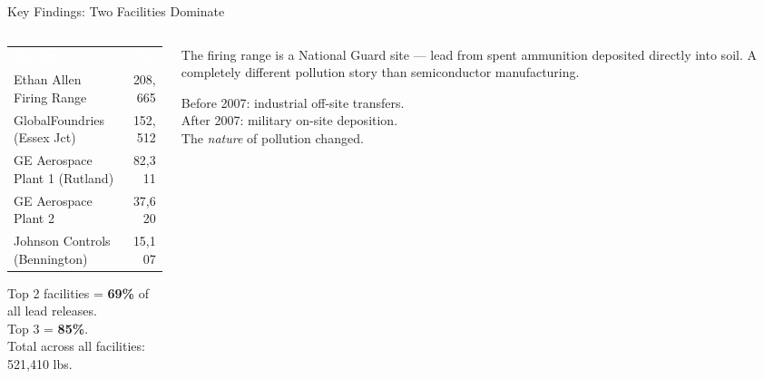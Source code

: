 \documentclass[aspectratio=169, 10pt]{beamer}
\begin{document}
\begin{frame}{Key Findings: Two Facilities Dominate}
\begin{columns}[T]
\begin{column}{0.55\textwidth}
\vskip2pt
{\small
\begin{tabular}{>{\raggedright\arraybackslash}m{4.8cm} r}
\rowcolor{SlateTeal}
\textcolor{white}{\textbf{Facility}} & \textcolor{white}{\textbf{Lbs}} \\[2pt]
\rowcolor{PaleSage}
Ethan Allen Firing Range & 208,665 \\[2pt]
\rowcolor{white}
GlobalFoundries (Essex Jct) & 152,512 \\[2pt]
\rowcolor{PaleSage}
GE Aerospace Plant 1 (Rutland) & 82,311 \\[2pt]
\rowcolor{white}
GE Aerospace Plant 2 & 37,620 \\[2pt]
\rowcolor{PaleSage}
Johnson Controls (Bennington) & 15,107 \\[2pt]
\end{tabular}
}
\vskip6pt
\begin{tcolorbox}[accentbox, top=3pt, bottom=3pt]
\small Top 2 facilities = \textbf{69\%} of all lead releases.\\
Top 3 = \textbf{85\%}.\\
Total across all facilities: 521,410 lbs.
\end{tcolorbox}
\end{column}
\begin{column}{0.40\textwidth}
\begin{tcolorbox}[quotebox]
\small
The firing range is a National Guard site --- lead from spent ammunition deposited directly into soil. A completely different pollution story than semiconductor manufacturing.
\end{tcolorbox}
\vskip4pt
\begin{tcolorbox}[keybox, title={\faClock\quad Time Trend}]
\scriptsize
Before 2007: industrial off-site transfers.\\
After 2007: military on-site deposition.\\
The \textit{nature} of pollution changed.
\end{tcolorbox}
\end{column}
\end{columns}
\end{frame}
\end{document}
